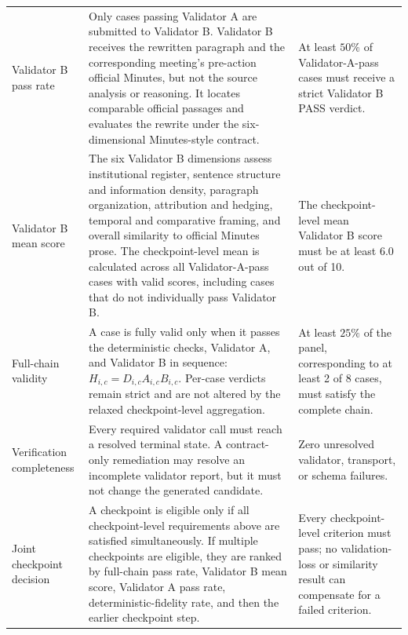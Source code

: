 \begin{table}[htbp]
\begin{tabularx}{\textwidth}{@{}
        >{\raggedright\arraybackslash}p{}
        >{\raggedright\arraybackslash}X
        >{\raggedright\arraybackslash}p{}
    @{}}
        Validator B pass rate &
        Only cases passing Validator A are submitted to Validator B. Validator B
        receives the rewritten paragraph and the corresponding meeting's
        pre-action official Minutes, but not the source analysis or reasoning.
        It locates comparable official passages and evaluates the rewrite under
        the six-dimensional Minutes-style contract. &
        At least $50\%$ of Validator-A-pass cases must receive a strict
        Validator B PASS verdict. \\

        Validator B mean score &
        The six Validator B dimensions assess institutional register, sentence
        structure and information density, paragraph organization, attribution
        and hedging, temporal and comparative framing, and overall similarity
        to official Minutes prose. The checkpoint-level mean is calculated
        across all Validator-A-pass cases with valid scores, including cases
        that do not individually pass Validator B. &
        The checkpoint-level mean Validator B score must be at least 6.0 out
        of 10. \\

        Full-chain validity &
        A case is fully valid only when it passes the deterministic checks,
        Validator A, and Validator B in sequence:
        $H_{i,c}=D_{i,c}A_{i,c}B_{i,c}$. Per-case verdicts remain strict and are
        not altered by the relaxed checkpoint-level aggregation. &
        At least $25\%$ of the panel, corresponding to at least 2 of 8 cases,
        must satisfy the complete chain. \\

        Verification completeness &
        Every required validator call must reach a resolved terminal state.
        A contract-only remediation may resolve an incomplete validator report,
        but it must not change the generated candidate. &
        Zero unresolved validator, transport, or schema failures. \\

        Joint checkpoint decision &
        A checkpoint is eligible only if all checkpoint-level requirements
        above are satisfied simultaneously. If multiple checkpoints are
        eligible, they are ranked by full-chain pass rate, Validator B mean
        score, Validator A pass rate, deterministic-fidelity rate, and then the
        earlier checkpoint step. &
        Every checkpoint-level criterion must pass; no validation-loss or
        similarity result can compensate for a failed criterion. \\


\end{tabularx}
\end{table}
